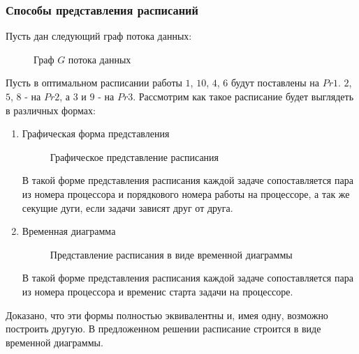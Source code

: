 \subsubsection{Способы представления расписаний}
Пусть дан следующий граф потока данных:
\begin{figure}[H]
    \caption{Граф $G$ потока данных}
\end{figure}
Пусть в оптимальном расписании работы $1$, $10$, $4$, $6$ будут поставлены на $Pr1$. $2$, $5$, $8$ - на $Pr2$, а $3$ и $9$ - на $Pr3$. Рассмотрим как такое расписание будет выглядеть в различных формах:
\begin{enumerate}
    \item Графическая форма представления
    \begin{figure}[H]
        \caption{Графическое представление расписания}
    \end{figure}
    В такой форме представления расписания каждой задаче сопоставляется пара из номера процессора и порядкового номера работы на процессоре, а так же секущие дуги, если задачи зависят друг от друга. 
    \item Временная диаграмма
    \begin{figure}[H]
        \caption{Представление расписания в виде временной диаграммы}
    \end{figure}
    В такой форме представления расписания каждой задаче сопоставляется пара из номера процессора и временис старта задачи на процессоре.
\end{enumerate}
Доказано, что эти формы полностью эквивалентны и, имея одну, возможно построить другую. В предложенном решении расписание строится в виде временной диаграммы.

